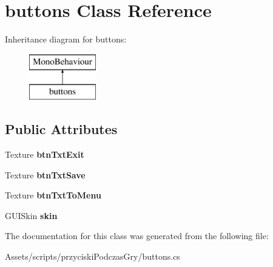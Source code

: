 \hypertarget{classbuttons}{}\section{buttons Class Reference}
\label{classbuttons}
Inheritance diagram for buttons\+:\begin{figure}[H]
\begin{center}
\leavevmode
\includegraphics[height=2.000000cm]{classbuttons}
\end{center}
\end{figure}
\subsection*{Public Attributes}
\begin{DoxyCompactItemize}
\item 
\mbox{\label{classbuttons_a0d09c922eebe4fb7476d96c915f3eb59}} 
Texture {\bfseries btn\+Txt\+Exit}
\item 
\mbox{\label{classbuttons_a1f3d953c197058e396bceb72a3488077}} 
Texture {\bfseries btn\+Txt\+Save}
\item 
\mbox{\label{classbuttons_a4013246c82d621dcde8250391386f1c0}} 
Texture {\bfseries btn\+Txt\+To\+Menu}
\item 
\mbox{\label{classbuttons_a09eeba1b6428f162c90e0037a49b54fc}} 
G\+U\+I\+Skin {\bfseries skin}
\end{DoxyCompactItemize}


The documentation for this class was generated from the following file\+:\begin{DoxyCompactItemize}
\item 
Assets/scripts/przyciski\+Podczas\+Gry/buttons.\+cs\end{DoxyCompactItemize}
